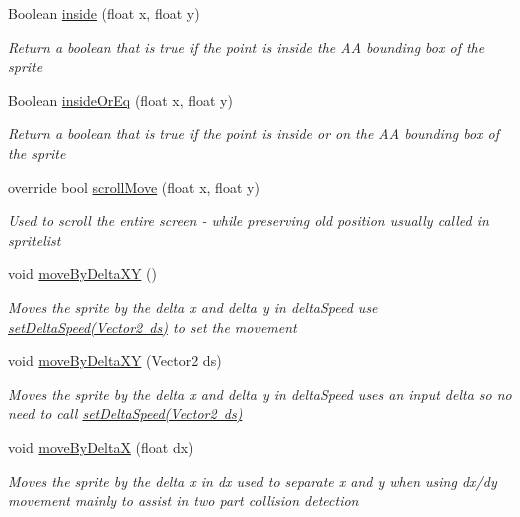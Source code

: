 \begin{DoxyCompactItemize}
Boolean \mbox{\hyperlink{class_r_c___framework_1_1_sprite3_addc1a2eb2b33095855d15652afac06e9}{inside}} (float x, float y)
\begin{DoxyCompactList}\small\item\em Return a boolean that is true if the point is inside the AA bounding box of the sprite\end{DoxyCompactList}\item 
Boolean \mbox{\hyperlink{class_r_c___framework_1_1_sprite3_abdaf66e3a0bcc82d446a2c3f059c3fba}{inside\+Or\+Eq}} (float x, float y)
\begin{DoxyCompactList}\small\item\em Return a boolean that is true if the point is inside or on the AA bounding box of the sprite\end{DoxyCompactList}\item 
override bool \mbox{\hyperlink{class_r_c___framework_1_1_sprite3_ab4c64556d7bcebf5ce538631ae9b5d6c}{scroll\+Move}} (float x, float y)
\begin{DoxyCompactList}\small\item\em Used to scroll the entire screen -\/ while preserving old position usually called in spritelist \end{DoxyCompactList}\item 
void \mbox{\hyperlink{class_r_c___framework_1_1_sprite3_a39a0fe699940c7d7f57971dd2edabe88}{move\+By\+Delta\+XY}} ()
\begin{DoxyCompactList}\small\item\em Moves the sprite by the delta x and delta y in delta\+Speed use \mbox{\hyperlink{class_r_c___framework_1_1_sprite3_a9a00bb05c798cc43c3518bb5ae6d0186}{set\+Delta\+Speed(\+Vector2 ds)}} to set the movement \end{DoxyCompactList}\item 
void \mbox{\hyperlink{class_r_c___framework_1_1_sprite3_a0cbdba681e9a06a6270415b1a527536e}{move\+By\+Delta\+XY}} (Vector2 ds)
\begin{DoxyCompactList}\small\item\em Moves the sprite by the delta x and delta y in delta\+Speed uses an input delta so no need to call \mbox{\hyperlink{class_r_c___framework_1_1_sprite3_a9a00bb05c798cc43c3518bb5ae6d0186}{set\+Delta\+Speed(\+Vector2 ds)}} \end{DoxyCompactList}\item 
void \mbox{\hyperlink{class_r_c___framework_1_1_sprite3_a6240d1baac5370a9be06ebaa4c188a95}{move\+By\+DeltaX}} (float dx)
\begin{DoxyCompactList}\small\item\em Moves the sprite by the delta x in dx used to separate x and y when using dx/dy movement mainly to assist in two part collision detection \end{DoxyCompactList}\item 

\end{DoxyCompactItemize}
